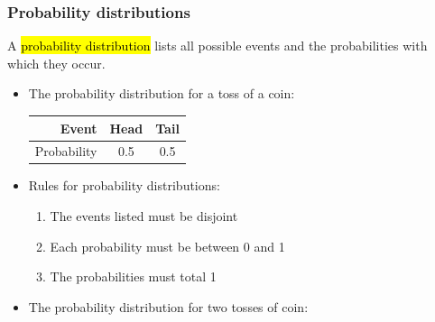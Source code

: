 \documentclass[notes,11pt, aspectratio=169]{beamer}
\begin{document}

\begin{frame}
\frametitle{Probability distributions}

A \hl{probability distribution} lists all possible events and the probabilities with which they occur.

\begin{itemize}
\item The probability distribution for a toss of a coin:
{\footnotesize 
\begin{center}
\begin{tabular}{r | c | c}
Event    & Head		& Tail \\
\hline
Probability	& 0.5		& 0.5 \\
\end{tabular}
\end{center}
}

\pause

\item Rules for probability distributions:
\begin{enumerate}
\item The events listed must be disjoint
\item Each probability must be between 0 and 1
\item The probabilities must total 1
\end{enumerate}

\pause

\item The probability distribution for two tosses of coin:

\end{itemize}

\end{frame}

\end{document}

